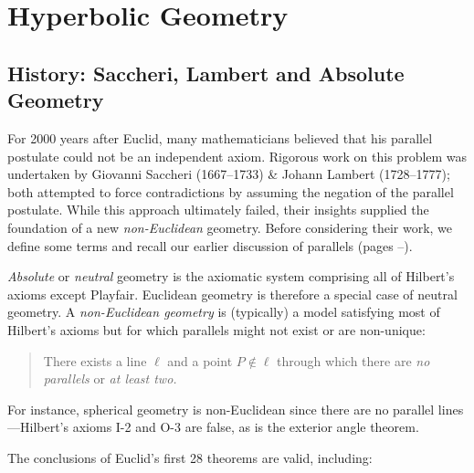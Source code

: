 \graphicspath{{4hyper/asy/}}


\section{Hyperbolic Geometry}\label{chap:hyper}

\subsection{History: Saccheri, Lambert and Absolute Geometry}\label{sec:hyp1}

For 2000 years after Euclid, many mathematicians believed that his parallel postulate could not be an independent axiom. Rigorous work on this problem was undertaken by Giovanni Saccheri (1667--1733) \& Johann Lambert (1728--1777); both attempted to force contradictions by assuming the negation of the parallel postulate. While this approach ultimately failed, their insights supplied the foundation of a new \emph{non-Euclidean} geometry. Before considering their work, we define some terms and recall our earlier discussion of parallels (pages \pageref{pg:parallelexist}--\pageref*{pg:pythagoras}).

\begin{defn}{}{}
	\emph{Absolute} or \emph{neutral} geometry is the axiomatic system comprising all of Hilbert's axioms except Playfair. Euclidean geometry is therefore a special case of neutral geometry.\smallbreak
	A \emph{non-Euclidean geometry} is (typically) a model satisfying most of Hilbert's axioms but for which parallels might not exist or are non-unique:
	\begin{quote}
		There exists a line $\ell$ and a point $P\not\in\ell$ through which there are \emph{no parallels} or \emph{at least two.}
	\end{quote}
\end{defn}

For instance, spherical geometry is non-Euclidean since there are no parallel lines---Hilbert's axioms I-2 and O-3 are false, as is the exterior angle theorem.



The conclusions of Euclid's first 28 theorems are valid, including:

